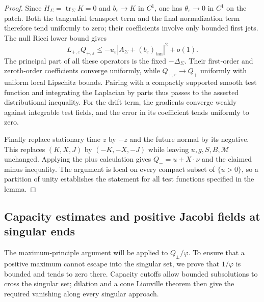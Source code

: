 \begin{proof}
Since $H_\Sigma=\operatorname{tr}_\Sigma K=0$ and
$b_\varepsilon\to K$ in $C^1$, one has
$\theta_\varepsilon\to0$ in $C^1$ on the patch.  Both the tangential
transport term and the final normalization term therefore tend
uniformly to zero; their coefficients involve only bounded first
jets.  The null Ricci lower bound gives
\[
 L_{+,\varepsilon}Q_{+,\varepsilon}
       \leq-u_\varepsilon
                 |A_\Sigma+(b_\varepsilon)_{\mathrm{tan}}|^2+o(1).
\]
The principal part of all these operators is the fixed
$-\Delta_\Sigma$.  Their first-order and zeroth-order coefficients
converge uniformly, while $Q_{+,\varepsilon}\to Q_+$ uniformly with
uniform local Lipschitz bounds.  Pairing with a compactly supported
smooth test function and integrating the Laplacian by parts thus
passes to the asserted distributional inequality.  For the drift
term, the gradients converge weakly against integrable test fields,
and the error in its coefficient tends uniformly to zero.

Finally replace stationary time $z$ by $-z$ and the future normal by
its negative.  This replaces $(K,X,J)$ by $(-K,-X,-J)$ while leaving
$u,g,S,B,\mathcal M$ unchanged.  Applying the plus calculation gives
$Q_-=u+X\cdot\nu$ and the claimed minus inequality.  The argument is
local on every compact subset of $\{u>0\}$, so a partition of unity
establishes the statement for all test functions specified in the
lemma.
\end{proof}

\subsection{Capacity estimates and positive Jacobi fields at singular ends}

The maximum-principle argument will be applied to $Q_\pm/\varphi$.
To ensure that a positive maximum cannot escape into the singular
set, we prove that $1/\varphi$ is bounded and tends to zero there.
Capacity cutoffs allow bounded subsolutions to cross the singular
set; dilation and a cone Liouville theorem then give the required
vanishing along every singular approach.

